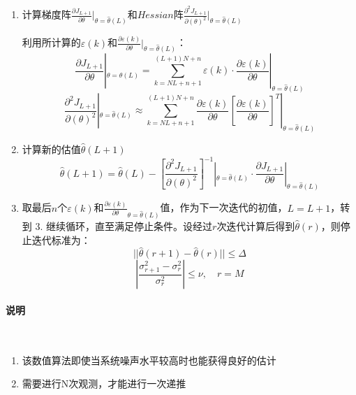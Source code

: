 \documentclass[UTF8]{article}
\begin{document}
\begin{enumerate}
    \item 计算梯度阵$\frac{\partial J_{L + 1}}{\partial \theta}|_{\theta = \hat{\theta}(L)}$和$Hessian$阵$\frac{\partial^2 J_{L + 1}}{\partial (\theta)^2}|_{\theta = \hat{\theta}(L)}$
    
    利用所计算的$\varepsilon(k)$和$\frac{\partial \varepsilon(k)}{\partial \theta}|_{\theta = \hat{\theta}(L)}$：
    \begin{equation*}
        \frac{\partial J_{L + 1}}{\partial \theta}|_{\theta = \hat{\theta}(L)} = \sum_{k = NL + n + 1}^{(L + 1)N + n} \varepsilon(k) \cdot \frac{\partial \varepsilon(k)}{\partial \theta}|_{\theta = \hat{\theta}(L)} 
    \end{equation*}
    \begin{equation*}
        \frac{\partial^2 J_{L + 1}}{\partial (\theta)^2}|_{\theta = \hat{\theta}(L)} \approx \sum_{k = NL + n + 1}^{(L + 1)N + n}\frac{\partial \varepsilon(k)}{\partial \theta}[\frac{\partial \varepsilon(k)}{\partial \theta}]^T|_{\theta = \hat{\theta}(L)}
    \end{equation*}

    \item 计算新的估值$\hat{\theta}(L + 1)$
    \begin{equation*}
        \hat{\theta}(L + 1) = \hat{\theta}(L) - [\frac{\partial^2 J_{L + 1}}{\partial (\theta)^2}]^{-1}|_{\theta = \hat{\theta}(L)} \cdot \frac{\partial J_{L + 1}}{\partial \theta}|_{\theta = \hat{\theta}(L)}
    \end{equation*}

    \item 取最后$n$个$\varepsilon(k)$和$\frac{\partial \varepsilon(k)}{\partial \theta}_{\theta = \hat{\theta}(L)}$值，作为下一次迭代的初值，$L = L + 1$，转到 $3.$ 继续循环，直至满足停止条件。设经过$r$次迭代计算后得到$\hat{\theta}(r)$，则停止迭代标准为：
    \begin{equation*}
        || \hat{\theta}(r + 1) - \hat{\theta}(r) || \le \Delta 
    \end{equation*}
    \begin{equation*}
        | \frac{\sigma_{r + 1}^2 - \sigma_r^2}{\sigma_r^2} | \le \nu, \quad r = M
    \end{equation*}
\end{enumerate}

\paragraph{说明}~{}
\begin{enumerate}
    \item 该数值算法即使当系统噪声水平较高时也能获得良好的估计
    \item 需要进行N次观测，才能进行一次递推
\end{enumerate}
\end{document}
